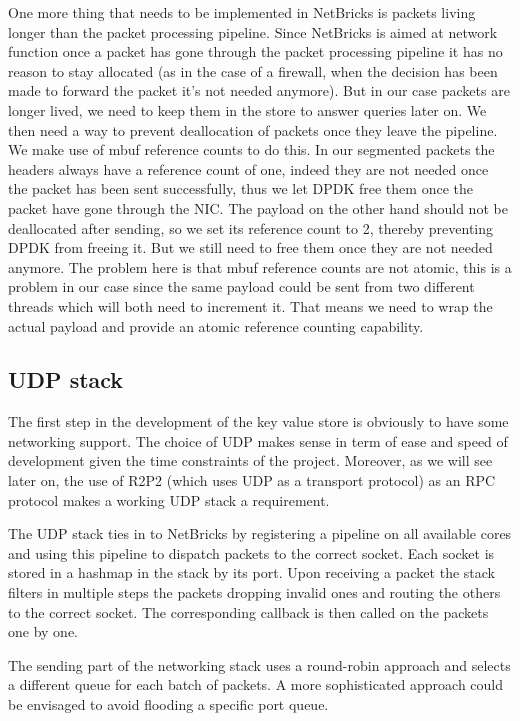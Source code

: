 \documentclass[11pt]{article}
\begin{document}
One more thing that needs to be implemented in NetBricks is packets
living longer than the packet processing pipeline. Since NetBricks is
aimed at network function once a packet has gone through the packet
processing pipeline it has no reason to stay allocated (as in the case
of a firewall, when the decision has been made to forward the packet
it's not needed anymore). But in our case packets are longer lived, we
need to keep them in the store to answer queries later on. We then
need a way to prevent deallocation of packets once they leave the
pipeline. We make use of mbuf reference counts to do this. In our
segmented packets the headers always have a reference count of one,
indeed they are not needed once the packet has been sent successfully,
thus we let DPDK free them once the packet have gone through the
NIC. The payload on the other hand should not be deallocated after
sending, so we set its reference count to 2, thereby preventing DPDK
from freeing it. But we still need to free them once they are not
needed anymore. The problem here is that mbuf reference counts are not
atomic, this is a problem in our case since the same payload could be
sent from two different threads which will both need to increment
it. That means we need to wrap the actual payload and provide an
atomic reference counting capability.

\subsection{UDP stack}
The first step in the development of the key value store is obviously
to have some networking support. The choice of UDP makes sense in term
of ease and speed of development given the time constraints of the
project. Moreover, as we will see later on, the use of R2P2 (which
uses UDP as a transport protocol) as an RPC protocol makes a
working UDP stack a requirement.

The UDP stack ties in to NetBricks by registering a pipeline on all
available cores and using this pipeline to dispatch packets to the
correct socket. Each socket is stored in a hashmap in the stack by its
port. Upon receiving a packet the stack filters in multiple steps the
packets dropping invalid ones and routing the others to the correct
socket. The corresponding callback is then called on the packets one
by one.

The sending part of the networking stack uses a round-robin approach
and selects a different queue for each batch of packets. A more
sophisticated approach could be envisaged to avoid flooding a specific
port queue.
\end{document}
